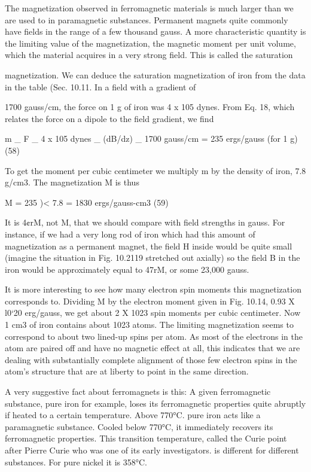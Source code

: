 {{The magnetization observed in ferromagnetic materials is much
larger than we are used to in paramagnetic substances. Permanent
magnets quite commonly have fields in the range of a few thousand
gauss. A more characteristic quantity is the limiting value of the
magnetization, the magnetic moment per unit volume, which the
material acquires in a very strong field. This is called the saturation

magnetization. We can deduce the saturation magnetization of iron
from the data in the table (Sec. 10.11. In a field with a gradient of

1700 gauss/cm, the force on 1 g of iron was 4 x 105 dynes. From
Eq. 18, which relates the force on a dipole to the field gradient, we find

m _ F _ 4 x 105 dynes
_ (dB/dz) _ 1700 gauss/cm
= 235 ergs/gauss (for 1 g) (58)

To get the moment per cubic centimeter we multiply m by the
density of iron, 7.8 g/cm3. The magnetization M is thus

M = 235 )< 7.8 = 1830 ergs/gauss-cm3 (59)

It is 4¢rM, not M, that we should compare with field strengths in gauss.
For instance, if we had a very long rod of iron which had this amount
of magnetization as a permanent magnet, the field H inside would
be quite small (imagine the situation in Fig. 10.2119 stretched out
axially) so the field B in the iron would be approximately equal to
47rM, or some 23,000 gauss.

It is more interesting to see how many electron spin moments this
magnetization corresponds to. Dividing M by the electron moment
given in Fig. 10.14, 0.93 X l0‘20 erg/gauss, we get about 2 X 1023
spin moments per cubic centimeter. Now 1 cm3 of iron contains
about 1023 atoms. The limiting magnetization seems to correspond
to about two lined-up spins per atom. As most of the electrons in
the atom are paired off and have no magnetic effect at all, this indicates
that we are dealing with substantially complete alignment
of those few electron spins in the atom's structure that are at liberty
to point in the same direction.

A very suggestive fact about ferromagnets is this: A given ferromagnetic
substance, pure iron for example, loses its ferromagnetic
properties quite abruptly if heated to a certain temperature. Above
770°C. pure iron acts like a paramagnetic substance. Cooled below
770°C, it immediately recovers its ferromagnetic properties. This
transition temperature, called the Curie point after Pierre Curie who
was one of its early investigators. is different for different substances.
For pure nickel it is 358°C.

}}
